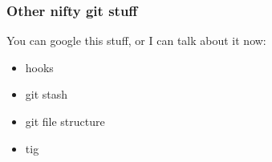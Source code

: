 \documentclass{beamer}
\begin{document}
\begin{frame}[fragile]

\frametitle{Other nifty git stuff}

You can google this stuff, or I can talk about it now:

\begin{itemize}
  \item{hooks}
  \item{git stash}
  \item{git file structure}
  \item{tig}
\end{itemize}
    
\end{frame}
\end{document}
